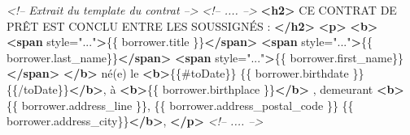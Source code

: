 \documentclass[12pt,a4paper]{article}
\newenvironment{Shaded}{}{}
\newcommand{\KeywordTok}[1]{\textcolor[rgb]{0.00,0.44,0.13}{\textbf{{#1}}}}
\newcommand{\StringTok}[1]{\textcolor[rgb]{0.25,0.44,0.63}{{#1}}}
\newcommand{\CommentTok}[1]{\textcolor[rgb]{0.38,0.63,0.69}{\textit{{#1}}}}
\newcommand{\OtherTok}[1]{\textcolor[rgb]{0.00,0.44,0.13}{{#1}}}
\newcommand{\NormalTok}[1]{{#1}}
\begin{document}
  \begin{Shaded}
  \begin{Highlighting}[]
  \CommentTok{<!-- Extrait du template du contrat -->}
  \CommentTok{<!-- .... -->}
  \KeywordTok{<h2>}
    \NormalTok{CE CONTRAT DE PRÊT EST CONCLU ENTRE LES SOUSSIGNÉS :}
  \KeywordTok{</h2>}
  \KeywordTok{<p>}
    \KeywordTok{<b>}
      \KeywordTok{<span}\OtherTok{ style=}\StringTok{"..."}\KeywordTok{>}\NormalTok{\{\{ borrower.title \}\}}\KeywordTok{</span>}
      \KeywordTok{<span}\OtherTok{ style=}\StringTok{"..."}\KeywordTok{>}\NormalTok{\{\{ borrower.last_name\}\}}\KeywordTok{</span>}
      \KeywordTok{<span}\OtherTok{ style=}\StringTok{"..."}\KeywordTok{>}\NormalTok{\{\{ borrower.first_name\}\}}\KeywordTok{</span>}
    \KeywordTok{</b>}
    \NormalTok{né(e) le}
    \KeywordTok{<b>}\NormalTok{\{\{#toDate\}\} \{\{ borrower.birthdate \}\} \{\{/toDate\}\}}\KeywordTok{</b>}\NormalTok{,}
    \NormalTok{à}
    \KeywordTok{<b>}\NormalTok{\{\{ borrower.birthplace \}\}}\KeywordTok{</b>}
    \NormalTok{, demeurant}
    \KeywordTok{<b>}
      \NormalTok{\{\{ borrower.address_line \}\},}
      \NormalTok{\{\{ borrower.address_postal_code \}\}}
      \NormalTok{\{\{ borrower.address_city\}\}}\KeywordTok{</b>}\NormalTok{,}
  \KeywordTok{</p>}
  \CommentTok{<!-- .... -->}
  \end{Highlighting}
  \end{Shaded}
\end{document}
